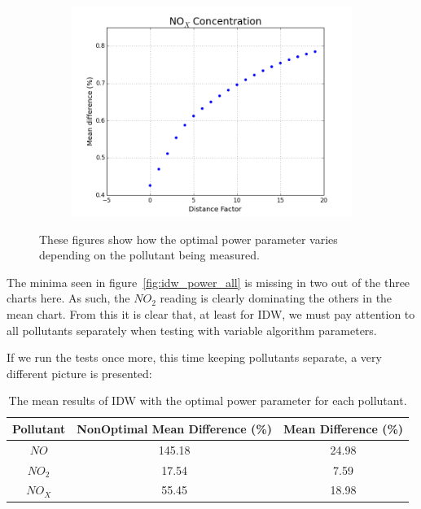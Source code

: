 \begin{figure}[H]
\begin{subfigure}{0.6\textwidth}
                    \caption{}
                    \label{fig:idw_power_NO2}
                \end{subfigure}
                \begin{subfigure}{0.6\textwidth}
                    \centering
                    \includegraphics[width=\linewidth]{./images/IDW_P_NOx.png}
                    \caption{}
                    \label{fig:idw_power_NOx}
                \end{subfigure}
                \caption{These figures show how the optimal power parameter varies depending on the pollutant being measured.}
                \label{fig:example_idw}
            \end{figure}

            The minima seen in figure~\ref{fig:idw_power_all} is missing in two out of the three charts here. As such, the $NO_{2}$ reading is clearly dominating the others in the mean chart. From this it is clear that, at least for IDW, we must pay attention to all pollutants separately when testing with variable algorithm parameters. 

            If we run the tests once more, this time keeping pollutants separate, a very different picture is presented:

			\begin{table}[H]
				\centering
	    		\begin{tabular}{|c|c|c|}
	    			\hline
					Pollutant & Non\-Optimal Mean Difference (\%) & Mean Difference (\%) \\ \hline
					$NO$ & 145.18 & 24.98 \\
					$NO_{2}$ & 17.54 & 7.59 \\
					$NO_{X}$ & 55.45 & 18.98 \\
					\hline
				\end{tabular}
				\caption{The mean results of IDW with the optimal power parameter for each pollutant.}
				\label{tab:idw_results_2}
			\end{table} 


